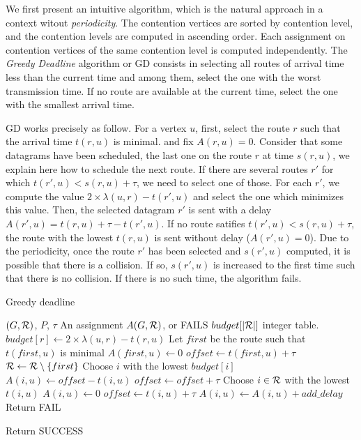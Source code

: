 \documentclass[english]{article}
\begin{document}
We first present an intuitive algorithm, which is the natural approach in a context witout \emph{periodicity}.
The contention vertices are sorted by contention level, and the contention levels are computed in ascending order. Each assignment on contention vertices of the same contention level is computed independently. The \emph{Greedy Deadline} algorithm or GD consists in selecting all routes of arrival time less than the current time and among them,
select the one with the worst transmission time. If no route are available at the current time, select the one with the
smallest arrival time.

GD works precisely as follow. For a vertex $u$, first, select the route $r$ such that the arrival time $t(r,u)$ is minimal. and fix $A(r,u) = 0$. Consider that some datagrams have been scheduled, the last one on the route $r$ at time $s(r,u)$, we explain here how to schedule the next route.  If there are several routes $r'$ for which $t(r',u) < s(r,u) + \tau $, we need to select one of those. For each $r'$, we compute the value $2\times \lambda(u,r) - t(r',u)$ and select the one which minimizes this value. Then, the selected datagram $r'$ is sent with a delay $A(r',u) = t(r,u) + \tau - t(r',u)$. If no route satifies $t(r',u) < s(r,u) + \tau$, the route with the lowest $t(r,u)$ is sent without delay ($A(r',u) = 0$). 
Due to the periodicity, once the route $r'$ has been selected and $s(r',u)$ computed, it is possible that there is a collision. If so, $s(r',u)$ is increased to the first time such that there is no collision. If there is no such time, the algorithm fails.


\begin{algorithm}[H]
	\caption{Greedy deadline}
	\begin{algorithmic}
	\REQUIRE $(G,{\cal R})$, $P$, $\tau$
	\ENSURE An assignment $A(G,{\cal R})$, or FAILS
	\STATE $budget[|{\cal R}|]$ integer table.
      \STATE  $budget[r] \leftarrow 2\times \lambda(u,r) - t(r,u)$
	\ENDFOR
	\STATE Let $first$ be the route such that $t(first,u)$ is minimal
	\STATE $A(first,u) \leftarrow 0$
	\STATE $offset \leftarrow t(first,u)+\tau$
	\STATE ${\cal R} \leftarrow {\cal R}\setminus \{first\}$
    \STATE Choose $i$ with the lowest $budget[i]$
    \STATE $A(i,u) \leftarrow offset - t(i,u)$
    \STATE $offset \leftarrow offset + \tau$
    \ELSE
     \STATE Choose $i \in {\cal R}$ with the lowest $t(i,u)$
     \STATE $A(i,u) \leftarrow 0$
     \STATE $offset \leftarrow t(i,u) + \tau$
    \ENDIF
    \STATE $A(i,u) \leftarrow A(i,u) + add\_delay$
    \ELSE
   \STATE Return FAIL
    \ENDIF
    \ENDIF
    
    \ENDWHILE
    \STATE Return SUCCESS
	\end{algorithmic}
	\end{algorithm}
\end{document}
